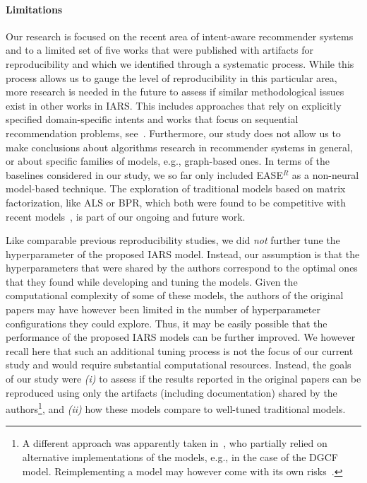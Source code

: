 \documentclass[sigconf,natbib=true,nonacm]{acmart}
\newcommand{\easer}{EASE$^R$\xspace}
\begin{document}
\paragraph{Limitations}
Our research is focused on the recent area of intent-aware recommender systems and to a limited set of five works that were published with artifacts for reproducibility and which we identified through a systematic process. While this process allows us to gauge the level of reproducibility in this particular area, more research is needed in the future to assess if similar methodological issues exist in other works in IARS. This includes approaches that rely on explicitly specified domain-specific intents and works that focus on sequential recommendation problems, see~\cite{jannach2024intent}. Furthermore, our study does not allow us to make conclusions about algorithms research in recommender systems in general, or about specific families of models, e.g., graph-based ones. In terms of the baselines considered in our study, we so far only included \easer as a non-neural model-based technique. The exploration of traditional models based on matrix factorization, like ALS or BPR, which both were found to be competitive with recent models~\cite{RendleKZK22Revisiting,RevisitingBPR2024}, is part of our ongoing and future work.

Like comparable previous reproducibility studies, we did \emph{not} further tune the hyperparameter of the proposed IARS model. Instead, our assumption is that the hyperparameters that were shared by the authors correspond to the optimal ones that they found while developing and tuning the models. Given the computational complexity of some of these models, the authors of the original papers may have however been limited in the number of hyperparameter configurations they could explore. Thus, it may be easily possible that the performance of the proposed IARS models can be further improved. We however recall here that such an additional tuning process is not the focus of our current study and would require substantial computational resources. Instead, the goals of our study were \emph{(i)} to assess if the results reported in the original papers can be reproduced using only the artifacts (including documentation) shared by the authors\footnote{A different approach was apparently taken in~\cite{Anelli2023Myth}, who partially relied on alternative implementations of the models, e.g., in the case of the DGCF model. Reimplementing a model may however come with its own risks~\cite{saidComparativeRecommenderSystem2014,HidasiC23ThirdParty}.}, and \emph{(ii)} how these models compare to well-tuned traditional models.
\end{document}
